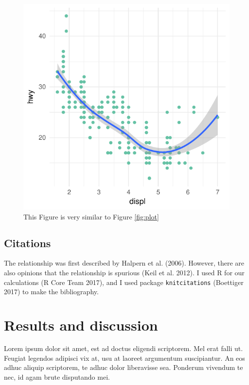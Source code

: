 \documentclass[]{article}
\begin{document}
\begin{figure}
\centering
\includegraphics{manuscript_template_files/figure-latex/plot-ref-1.pdf}
\caption{This Figure is very similar to Figure \ref{fig:plot}
\label{fig2:plot}}
\end{figure}

\subsection{Citations}\label{citations}

The relationship was first described by Halpern et al. (2006). However,
there are also opinions that the relationship is spurious (Keil et al.
2012). I used R for our calculations (R Core Team 2017), and I used
package \texttt{knitcitations} (Boettiger 2017) to make the
bibliography.

\section{Results and discussion}\label{results-and-discussion}

Lorem ipsum dolor sit amet, est ad doctus eligendi scriptorem. Mel erat
falli ut. Feugiat legendos adipisci vix at, usu at laoreet argumentum
suscipiantur. An eos adhuc aliquip scriptorem, te adhuc dolor
liberavisse sea. Ponderum vivendum te nec, id agam brute disputando mei.
\end{document}
